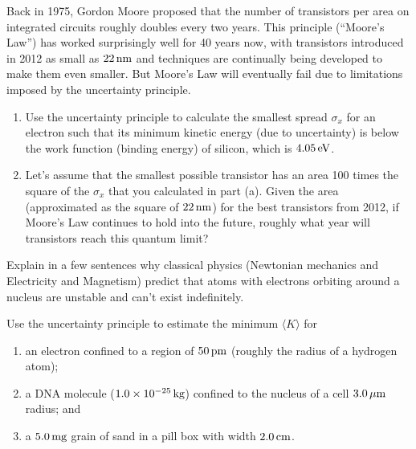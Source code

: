 \begin{problem}
Back in 1975, Gordon Moore proposed that the number of transistors
per area on integrated circuits roughly doubles every two years.
This principle (``Moore's Law'') has worked surprisingly well for
40 years now, with transistors introduced in 2012 as small as $22\,\mbox{nm}$
and techniques are continually being developed to make them even 
smaller. But Moore's Law will eventually fail due to limitations 
imposed by the uncertainty principle.

\begin{enumerate}
\item Use the uncertainty principle to calculate the smallest spread
$\sigma_x$ for an electron such that its minimum kinetic energy (due to
uncertainty) is below the work function (binding energy) of silicon,
which is $4.05\,\mbox{eV}$.  
\item Let's assume that the smallest
possible transistor has an area 100 times the square of the $\sigma_x$
that you calculated in part (a).  Given the area (approximated as the square
of $22\,\mbox{nm}$) for the best transistors from 2012, 
if Moore's Law continues to hold into the future, roughly what year will
transistors reach this quantum limit?  
\end{enumerate}
\end{problem}


\begin{problem}
Explain in a few sentences why classical physics (Newtonian mechanics and 
Electricity and Magnetism) predict that atoms with electrons
orbiting around a nucleus are unstable and can't exist
indefinitely.
\end{problem}

\newpage


\begin{problem}
Use the uncertainty principle to estimate the minimum $\langle K\rangle$ 
for 
\begin{enumerate}
\item an electron confined to a region of $50\,\mbox{pm}$ (roughly the 
radius of a hydrogen atom); 
\item a DNA molecule ($1.0 \times 10^{-25}\,\mbox{kg}$) confined 
to the nucleus of a cell $3.0\,\mbox{$\mu$m}$ radius; and
\item a $5.0\,\mbox{mg}$ grain of sand in a pill box with width 
$2.0\,\mbox{cm}$.
\end{enumerate}
\label{prob:MinK}
\end{problem}

